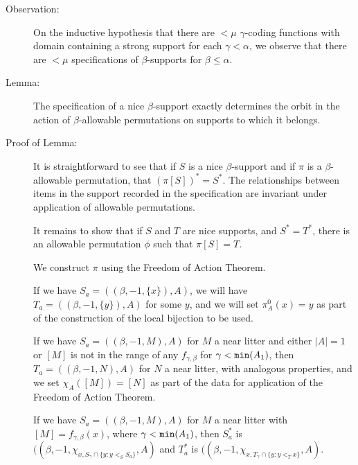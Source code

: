 \documentclass[112pt]{article}
\begin{document}
\begin{description}
\begin{enumerate}
\end{enumerate}

\begin{comment}

Peter wants a definition of the type specification independent of the type support.  Use tags.   It's a good idea.

\end{comment}

\item[Observation:]  On the inductive hypothesis that there are $<\mu$ $\gamma$-coding functions with domain containing a strong support for each $\gamma<\alpha$, we observe that there are $<\mu$ specifications of $\beta$-supports for $\beta\leq \alpha$.

\item[Lemma:]  The specification of a nice $\beta$-support exactly determines the orbit in the action of $\beta$-allowable permutations on supports to which it belongs.

\item[Proof of Lemma:]

It is straightforward to see that if $S$ is a nice $\beta$-support and if $\pi$ is a $\beta$-allowable permutation, that $(\pi[S])^* = S^*$.  The relationships between items in the support recorded in the specification are invariant under application of allowable permutations.

It remains to show that if $S$ and $T$ are nice supports, and $S^*=T^*$, there is an allowable permutation $\phi$ such that $\pi[S]=T$.

We construct $\pi$ using the Freedom of Action Theorem.

If we have $S_a = ((\beta,-1,\{x\}),A)$, we will have $T_a = ((\beta,-1,\{y\}),A)$ for some $y$, and we will set $\pi^0_A(x) = y$ as part of the construction of the local bijection to be used.

If we have $S_a = ((\beta,-1,M),A)$ for $M$ a near litter and either $|A|=1$ or $[M]$ is not in the range of any $f_{\gamma,\beta}$ for $\gamma<{\tt min}(A_1)$, then $T_a = ((\beta,-1,N),A)$ for $N$ a near litter, with analogous properties, and we set $\chi_A([M])=[N]$ as part of the data for application of the Freedom of Action Theorem.

If we have $S_a= ((\beta,-1,M),A)$ for $M$ a near litter with $[M] = f_{\gamma,\beta}(x)$, where $\gamma<{\tt min}(A_1)$,
then $S^*_a$ is $((\beta,-1,\chi_{x,S_{\gamma}\cap \{y:y <_S S_a\}},A)$ and $T^*_a$ is $((\beta,-1,\chi_{x,T_{\gamma}\cap \{y:y <_T x\}},A).$


\end{description}
\end{document}

